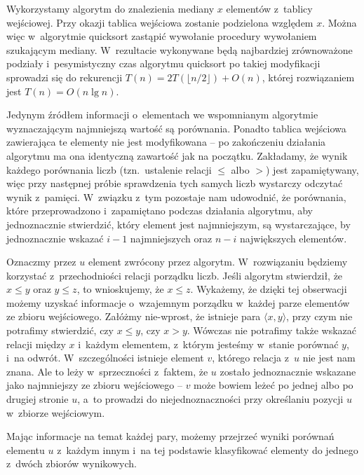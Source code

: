 \exercise %

\noindent Wykorzystamy algorytm  do znalezienia mediany $x$ elementów z~tablicy wejściowej.
Przy okazji tablica wejściowa zostanie podzielona względem $x$.
Można więc w~algorytmie quicksort zastąpić wywołanie procedury  wywołaniem  szukającym mediany.
W~rezultacie wykonywane będą najbardziej zrównoważone podziały i~pesymistyczny czas algorytmu quicksort po takiej modyfikacji sprowadzi się do rekurencji $T(n)=2T(\lfloor n/2\rfloor)+O(n)$, której rozwiązaniem jest $T(n)=O(n\lg n)$.

\exercise %
Jedynym źródłem informacji o~elementach we wspomnianym algorytmie wyznaczającym  najmniejszą wartość są porównania.
Ponadto tablica wejściowa zawierająca te elementy nie jest modyfikowana -- po zakończeniu działania algorytmu ma ona identyczną zawartość jak na początku.
Zakładamy, że wynik każdego porównania liczb (tzn.\ ustalenie relacji $\le$ albo $>$) jest zapamiętywany, więc przy następnej próbie sprawdzenia tych samych liczb wystarczy odczytać wynik z~pamięci.
W~związku z~tym pozostaje nam udowodnić, że porównania, które przeprowadzono i~zapamiętano podczas działania algorytmu, aby jednoznacznie stwierdzić, który element jest  najmniejszym, są wystarczające, by jednoznacznie wskazać $i-1$ najmniejszych oraz $n-i$ największych elementów.

Oznaczmy przez $u$ element zwrócony przez algorytm.
W~rozwiązaniu będziemy korzystać z~przechodniości relacji porządku liczb.
Jeśli algorytm stwierdził, że $x\le y$ oraz $y\le z$, to wnioskujemy, że $x\le z$.
Wykażemy, że dzięki tej obserwacji możemy uzyskać informacje o~wzajemnym porządku w~każdej parze elementów ze zbioru wejściowego.
Załóżmy nie-wprost, że istnieje para $\langle x,y\rangle$, przy czym nie potrafimy stwierdzić, czy $x\le y$, czy $x>y$.
Wówczas nie potrafimy także wskazać relacji między $x$ i~każdym elementem, z~którym jesteśmy w~stanie porównać $y$, i~na odwrót.
W~szczególności istnieje element $v$, którego relacja z~$u$ nie jest nam znana.
Ale to leży w~sprzeczności z~faktem, że $u$ zostało jednoznacznie wskazane jako  najmniejszy ze zbioru wejściowego -- $v$ może bowiem leżeć po jednej albo po drugiej stronie $u$, a~to prowadzi do niejednoznaczności przy określaniu pozycji $u$ w~zbiorze wejściowym.

Mając informacje na temat każdej pary, możemy przejrzeć wyniki porównań elementu $u$ z~każdym innym i~na tej podstawie klasyfikować elementy do jednego z~dwóch zbiorów wynikowych.


